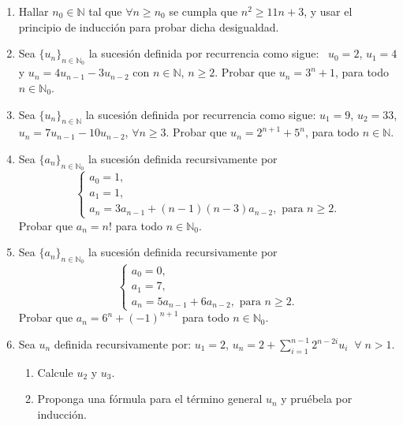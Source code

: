 \documentclass[a4paper,12pt,twoside,spanish,reqno]{amsbook}
\numberwithin{equation}{section}
\begin{document}
\begin{enumerate}
\item Hallar $n_0 \in {\mathbb N}$ tal que $\forall n \ge n_0$ se cumpla que $n^2 \ge 11 n + 3$, y usar el principio de inducción para probar dicha desigualdad.

\item Sea $\{u_n\}_{n \in \mathbb N_0}$ la sucesión definida por recurrencia como sigue: \ $u_0=2$, $u_1=4$ y $u_n=4 u_{n-1} - 3 u_{n-2}$ con $n\in \mathbb N$, $n\geq 2$. Probar que $u_n=3^n+1$, para todo $n\in\mathbb{N}_0$.

\item Sea $\{ u_n \}_{n \in \mathbb N}$ la sucesión definida por recurrencia como sigue: $u_1 = 9$, $u_2 = 33$, $u_n = 7u_{n-1} - 10u_{n-2}$, $\forall n \geq 3$. Probar que $u_n = 2^{n+1} + 5^n$, para todo $n \in \mathbb N$.


\item  Sea $\{a_n\}_{n\in\mathbb N_0}$ la sucesi\'on definida recursivamente por
$$\begin{cases}
a_0=1, \\a_1=1, \\a_{n} = 3a_{n-1}+(n-1)(n-3)a_{n-2}, \text{ para $n\geq 2$}.
\end{cases}$$
Probar que $a_n=n!$ para todo $n\in \mathbb N_0$.

\item Sea $\{a_n\}_{n\in\mathbb N_0}$ la sucesi\'on definida recursivamente por
$$\begin{cases}
   a_0=0, \\a_1=7, \\a_{n} = 5a_{n-1}+6a_{n-2}, \text{ para $n\geq 2$}.
  \end{cases}$$
Probar que $a_n=6^n + (-1)^{n+1}$ para todo $n\in \mathbb N_0$.

\newpage

\item Sea $u_n$ definida recursivamente por: $u_1=2$, $u_n=2+\sum_{i=1}^{n-1}2^{n-2i}u_i \;\;\forall\; n >1$.
\begin{enumerate}
	\item Calcule $u_2$ y $u_3$.
	\item Proponga una fórmula para el término general $u_n$ y pruébela por inducción.
\end{enumerate}



\end{enumerate}
\end{document}

